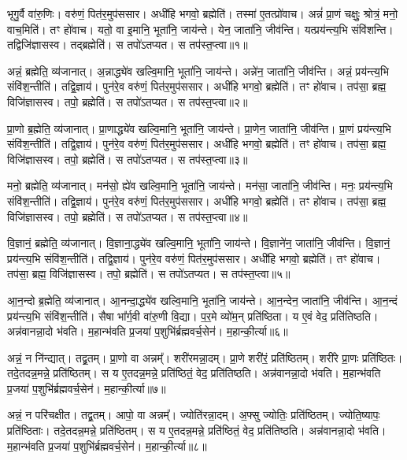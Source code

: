 भृगु॒र्वै वा॑रु॒णिः। 
वरु॑णं॒ पित॑र॒मुप॑ससार। 
अधी॑हि भगवो॒ ब्रह्मेति॑। 
तस्मा॑ ए॒तत्प्रो॑वाच। 
अन्नं॑ प्रा॒णं चक्षुः॒ श्रोत्रं॒ मनो॒ वाच॒मिति॑। 
तꣳ हो॑वाच। 
यतो॒ वा इ॒मानि॒ भूता॑नि॒ जाय॑न्ते। 
येन॒ जाता॑नि॒ जीव॑न्ति। 
यत्प्रय॑न्त्य॒भि संवि॑शन्ति। 
तद्विजि॑ज्ञासस्व। 
तद्ब्रह्मेति॑। 
स तपो॑ऽतप्यत। 
स तप॑स्त॒प्त्वा॥१॥

अन्नं॒ ब्रह्मेति॒ व्य॑जानात्। 
अ॒न्नाद्ध्ये॑व खल्वि॒मानि॒ भूता॑नि॒ जाय॑न्ते। 
अन्ने॑न॒ जाता॑नि॒ जीव॑न्ति। 
अन्नं॒ प्रय॑न्त्य॒भि संवि॑श॒न्तीति॑। 
तद्वि॒ज्ञाय॑। 
पुन॑रे॒व वरु॑णं॒ पित॑र॒मुप॑ससार। 
अधी॑हि भगवो॒ ब्रह्मेति॑। 
तꣳ हो॑वाच। 
तप॑सा॒ ब्रह्म॒ विजि॑ज्ञासस्व। 
तपो॒ ब्रह्मेति॑। 
स तपो॑ऽतप्यत। 
स तप॑स्त॒प्त्वा॥२॥

प्रा॒णो ब्र॒ह्मेति॒ व्य॑जानात्। 
प्रा॒णाद्ध्ये॑व खल्वि॒मानि॒ भूता॑नि॒ जाय॑न्ते। 
प्रा॒णेन॒ जाता॑नि॒ जीव॑न्ति। 
प्रा॒णं प्रय॑न्त्य॒भि संवि॑श॒न्तीति॑। 
तद्वि॒ज्ञाय॑। 
पुन॑रे॒व वरु॑णं॒ पित॑र॒मुप॑ससार। 
अधी॑हि भगवो॒ ब्रह्मेति॑। 
तꣳ हो॑वाच। 
तप॑सा॒ ब्रह्म॒ विजि॑ज्ञासस्व। 
तपो॒ ब्रह्मेति॑। 
स तपो॑ऽतप्यत। 
स तप॑स्त॒प्त्वा॥३॥

मनो॒ ब्रह्मेति॒ व्य॑जानात्। 
मन॑सो॒ ह्ये॑व खल्वि॒मानि॒ भूता॑नि॒ जाय॑न्ते। 
मन॑सा॒ जाता॑नि॒ जीव॑न्ति। 
मनः॒ प्रय॑न्त्य॒भि संवि॑श॒न्तीति॑। 
तद्वि॒ज्ञाय॑। 
पुन॑रे॒व वरु॑णं॒ पित॑र॒मुप॑ससार। 
अधी॑हि भगवो॒ ब्रह्मेति॑। 
तꣳ हो॑वाच। 
तप॑सा॒ ब्रह्म॒ विजि॑ज्ञासस्व। 
तपो॒ ब्रह्मेति॑। 
स तपो॑ऽतप्यत। 
स तप॑स्त॒प्त्वा॥४॥

वि॒ज्ञानं॒ ब्रह्मेति॒ व्य॑जानात्। 
वि॒ज्ञाना॒द्ध्ये॑व खल्वि॒मानि॒ भूता॑नि॒ जाय॑न्ते। 
वि॒ज्ञाने॑न॒ जाता॑नि॒ जीव॑न्ति। 
वि॒ज्ञानं॒ प्रय॑न्त्य॒भि संवि॑श॒न्तीति॑। 
तद्वि॒ज्ञाय॑। 
पुन॑रे॒व वरु॑णं॒ पित॑र॒मुप॑ससार। 
अधी॑हि भगवो॒ ब्रह्मेति॑। 
तꣳ हो॑वाच। 
तप॑सा॒ ब्रह्म॒ विजि॑ज्ञासस्व। 
तपो॒ ब्रह्मेति॑। 
स तपो॑ऽतप्यत। 
स तप॑स्त॒प्त्वा॥५॥

आ॒न॒न्दो ब्र॒ह्मेति॒ व्य॑जानात्। 
आ॒नन्दा॒द्ध्ये॑व खल्वि॒मानि॒ भूता॑नि॒ जाय॑न्ते। 
आ॒न॒न्देन॒ जाता॑नि॒ जीव॑न्ति। 
आ॒न॒न्दं प्रय॑न्त्य॒भि संवि॑श॒न्तीति॑। 
सैषा भा᳚र्ग॒वी वा॑रु॒णी वि॒द्या। 
प॒र॒मे व्यो॑म॒न् प्रति॑\-ष्ठिता। 
य ए॒वं वेद॒ प्रति॑\-तिष्ठति। 
अन्न॑वानन्ना॒दो भ॑वति। 
म॒हान्भ॑वति प्र॒जया॑ प॒शुभि॑र्ब्रह्मवर्च॒सेन॑। 
म॒हान्की॒र्त्या॥६॥

अन्नं॒ न नि॑न्द्यात्। 
तद्व्र॒तम्। 
प्रा॒णो वा अन्नम्᳚। 
शरी॑रमन्ना॒दम्। 
प्रा॒णे शरी॑रं॒ प्रति॑\-ष्ठितम्। 
शरी॑रे प्रा॒णः प्रति॑\-ष्ठितः। 
तदे॒तदन्न॒मन्ने॒ प्रति॑\-ष्ठितम्। 
स य ए॒तदन्न॒मन्ने॒ प्रति॑\-ष्ठितं॒ वेद॒ प्रति॑\-तिष्ठति। 
अन्न॑वानन्ना॒दो भ॑वति। 
म॒हान्भ॑वति प्र॒जया॑ प॒शुभि॑र्ब्रह्मवर्च॒सेन॑। 
म॒हान्की॒र्त्या॥७॥

अन्नं॒ न परि॑चक्षीत। 
तद्व्र॒तम्। 
आपो॒ वा अन्नम्᳚। 
ज्योति॑रन्ना॒दम्। 
अ॒फ्सु ज्योतिः॒ प्रति॑\-ष्ठितम्। 
ज्योति॒ष्यापः॒ प्रति॑\-ष्ठिताः। 
तदे॒तदन्न॒मन्ने॒ प्रति॑\-ष्ठितम्। 
स य ए॒तदन्न॒मन्ने॒ प्रति॑\-ष्ठितं॒ वेद॒ प्रति॑\-तिष्ठति। 
अन्न॑वानन्ना॒दो भ॑वति। 
म॒हान्भ॑वति प्र॒जया॑ प॒शुभि॑र्ब्रह्मवर्च॒सेन॑। 
म॒हान्की॒र्त्या॥८॥

